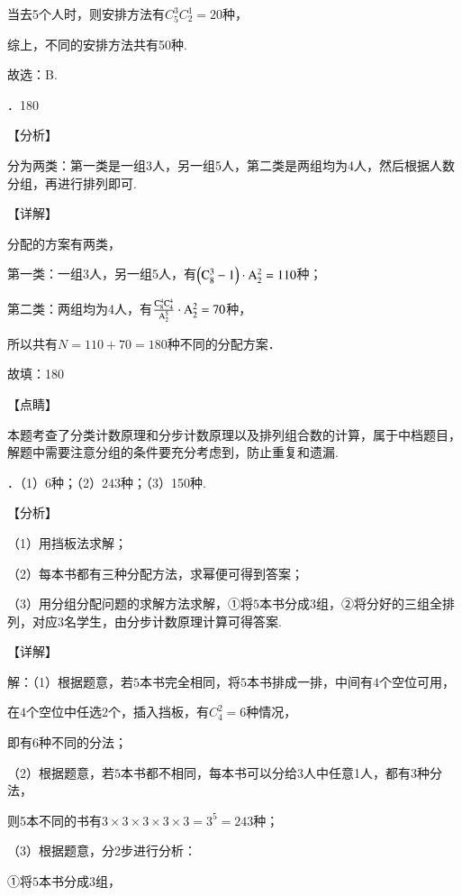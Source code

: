 \documentclass[a4paper,11pt,UTF8,twoside]{ctexart} %
\begin{document}
\noindent 当去5个人时，则安排方法有$C_{5}^{3} C_{2}^{1} =20$种，

\noindent 综上，不同的安排方法共有50种.

\noindent 故选：B.

．180

\noindent 【分析】

\noindent 分为两类：第一类是一组3人，另一组5人，第二类是两组均为4人，然后根据人数分组，再进行排列即可.

\noindent 【详解】

\noindent 分配的方案有两类，

\noindent 第一类：一组3人，另一组5人，有$\left({\rm C}_{8}^{3} -1\right)\cdot {\rm A}_{2}^{2} =110$种；

\noindent 第二类：两组均为4人，有$\frac{{\rm C}_{8}^{4} {\rm C}_{4}^{4} }{{\rm A}_{2}^{5} } \cdot {\rm A}_{2}^{2} =70$种，

\noindent 所以共有$N=110+70=180$种不同的分配方案．

\noindent 故填：180

\noindent 【点睛】

\noindent 本题考查了分类计数原理和分步计数原理以及排列组合数的计算，属于中档题目，解题中需要注意分组的条件要充分考虑到，防止重复和遗漏.

．（1）$6$种；（2）$243$种；（3）150种.

\noindent 【分析】

\noindent （1）用挡板法求解；

\noindent （2）每本书都有三种分配方法，求幂便可得到答案；

\noindent （3）用分组分配问题的求解方法求解，①将$5$本书分成$3$组，②将分好的三组全排列，对应3名学生，由分步计数原理计算可得答案.

\noindent 【详解】

\noindent 解：（1）根据题意，若$5$本书完全相同，将$5$本书排成一排，中间有$4$个空位可用，

\noindent 在$4$个空位中任选$2$个，插入挡板，有$C_{4}^{2} =6$种情况，

\noindent 即有$6$种不同的分法；

\noindent （2）根据题意，若$5$本书都不相同，每本书可以分给$3$人中任意1人，都有3种分法，

\noindent 则5本不同的书有$3\times 3\times 3\times 3\times 3=3^{5} =243$种；

\noindent （3）根据题意，分2步进行分析：

\noindent ①将$5$本书分成$3$组，
\end{document}
